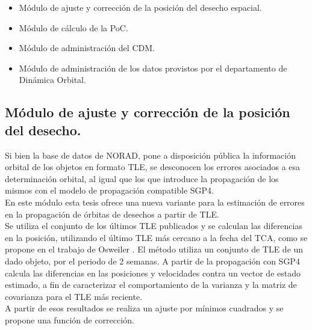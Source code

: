 \begin{itemize}
\item M\'odulo de ajuste y correcci\'on de la posici\'on del desecho espacial.\\
\item M\'odulo de c\'alculo de la PoC.\\
\item M\'odulo de administraci\'on del CDM.\\
\item M\'odulo de administraci\'on de los datos provistos por el departamento de Din\'amica Orbital.\\
\end{itemize}


\subsection*{M\'odulo de ajuste y correcci\'on de la posici\'on del desecho.}
Si bien la base de datos de NORAD, pone a disposici\'on p\'ublica la informaci\'on orbital de los objetos en formato TLE, se desconocen los errores asociados a esa determinaci\'on orbital, al igual que los que introduce la propagaci\'on de los mismos con el modelo de propagaci\'on compatible SGP4.\\
En este m\'odulo esta tesis ofrece una nueva variante para la estimaci\'on de errores en la propagaci\'on de \'orbitas de desechos a partir de TLE.\\
Se utiliza el conjunto de los \'ultimos TLE publicados y se calculan las diferencias en la posici\'on, utilizando el \'ultimo TLE m\'as cercano a la fecha del TCA, como se propone en el trabajo de Osweiler \cite{osweiler}. El m\'etodo utiliza un conjunto de TLE de un dado objeto, por el periodo de 2 semanas. A partir de la propagaci\'on con SGP4 calcula las diferencias en las posiciones y velocidades contra un vector de estado estimado, a fin de caracterizar el comportamiento de la varianza y la matriz de covarianza para el TLE m\'as reciente.\\
A partir de esos resultados se realiza un ajuste por m\'inimos cuadrados y se propone una funci\'on de corrección.\\

